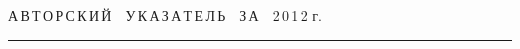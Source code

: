 




\def\stat{cont}


{%




\raggedleft\Large \bf%


А\,В\,Т\,О\,Р\,С\,К\,И\,Й\ \ У\,К\,А\,З\,А\,Т\,Е\,Л\,Ь\ \ З\,А\ \ 2\,0\,1\,2 г. \vskip 17pt


    \hrule


    \par




 }





\label{st\stat}

















\def\leftkol{\ } %


\def\rightkol{\ } %
















\vspace*{-24pt}





\noindent


